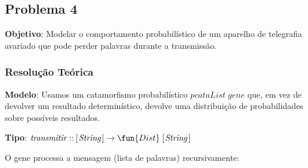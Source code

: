 \documentclass[11pt, a4paper, fleqn]{article}
\newcommand{\Conid}[1]{\mathit{#1}}
\newcommand{\Varid}[1]{\mathit{#1}}
\begin{document}
\subsection*{Problema 4}

\textbf{Objetivo}: Modelar o comportamento probabilístico de um aparelho de telegrafia avariado que pode perder palavras durante a transmissão.

\subsubsection*{Resolução Teórica}

\textbf{Modelo}: Usamos um catamorfismo probabilístico \ensuremath{\Varid{pcataList}\;\Varid{gene}} que, em vez de devolver um resultado determinístico, devolve uma distribuição de probabilidades sobre possíveis resultados.

\textbf{Tipo}: \ensuremath{\Varid{transmitir}\mathbin{::}[\mskip1.5mu \Conid{String}\mskip1.5mu]\to \fun{Dist}\;[\mskip1.5mu \Conid{String}\mskip1.5mu]}

O gene processa a mensagem (lista de palavras) recursivamente:
\end{document}
